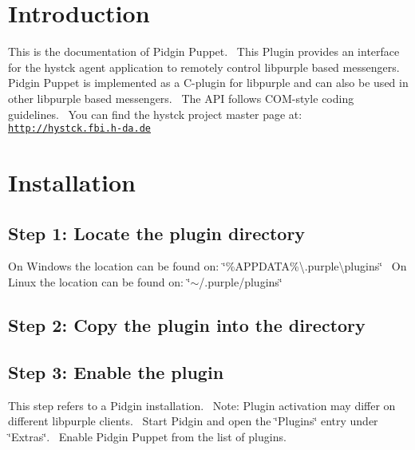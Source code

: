 \hypertarget{index_intro_sec}{}\section{Introduction}\label{index_intro_sec}
This is the documentation of Pidgin Puppet.~\newline
 This Plugin provides an interface for the hystck agent application to remotely control libpurple based messengers.~\newline
 Pidgin Puppet is implemented as a C-\/plugin for libpurple and can also be used in other libpurple based messengers.~\newline
 The A\+PI follows C\+O\+M-\/style coding guidelines.~\newline
 You can find the hystck project master page at\+: \href{http://hystck.fbi.h-da.de}{\tt http\+://hystck.\+fbi.\+h-\/da.\+de}\hypertarget{index_install_sec}{}\section{Installation}\label{index_install_sec}
\hypertarget{index_step1}{}\subsection{Step 1\+: Locate the plugin directory}\label{index_step1}
On Windows the location can be found on\+: \char`\"{}\%\+A\+P\+P\+D\+A\+T\+A\%\textbackslash{}.\+purple\textbackslash{}plugins\char`\"{}~\newline
 On Linux the location can be found on\+: \char`\"{}$\sim$/.\+purple/plugins\char`\"{}\hypertarget{index_step2}{}\subsection{Step 2\+: Copy the plugin into the directory}\label{index_step2}
\hypertarget{index_step3}{}\subsection{Step 3\+: Enable the plugin}\label{index_step3}
This step refers to a Pidgin installation.~\newline
 Note\+: Plugin activation may differ on different libpurple clients.~\newline
 Start Pidgin and open the \char`\"{}\+Plugins\char`\"{} entry under \char`\"{}\+Extras\char`\"{}.~\newline
 Enable Pidgin Puppet from the list of plugins.~\newline
